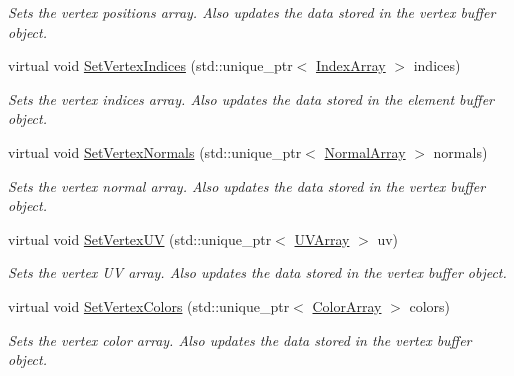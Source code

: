 \begin{DoxyCompactItemize}
\begin{DoxyCompactList}\small\item\em Sets the vertex positions array. Also updates the data stored in the vertex buffer object. \end{DoxyCompactList}\item 
virtual void \hyperlink{class_rendering_object_a61ea597df0c456834eac8eb4087fb573}{Set\+Vertex\+Indices} (std\+::unique\+\_\+ptr$<$ \hyperlink{class_rendering_object_a9931c88bca3384065c6691dfe1e60af1}{Index\+Array} $>$ indices)
\begin{DoxyCompactList}\small\item\em Sets the vertex indices array. Also updates the data stored in the element buffer object. \end{DoxyCompactList}\item 
virtual void \hyperlink{class_rendering_object_a4cd085aed01fbc5e4fae7076e00919d3}{Set\+Vertex\+Normals} (std\+::unique\+\_\+ptr$<$ \hyperlink{class_rendering_object_a327c4d892de8d6138fb59afa6d078257}{Normal\+Array} $>$ normals)
\begin{DoxyCompactList}\small\item\em Sets the vertex normal array. Also updates the data stored in the vertex buffer object. \end{DoxyCompactList}\item 
virtual void \hyperlink{class_rendering_object_a2a2b3c6ec2d13e8d3a4b6ac4c05ae11b}{Set\+Vertex\+U\+V} (std\+::unique\+\_\+ptr$<$ \hyperlink{class_rendering_object_a504ecd45ebe36dfa5b78c46d64d9904a}{U\+V\+Array} $>$ uv)
\begin{DoxyCompactList}\small\item\em Sets the vertex U\+V array. Also updates the data stored in the vertex buffer object. \end{DoxyCompactList}\item 
virtual void \hyperlink{class_rendering_object_aa1170c47ff02b2305a54c8aab3460201}{Set\+Vertex\+Colors} (std\+::unique\+\_\+ptr$<$ \hyperlink{class_rendering_object_a8a12e1f9be788d99af6c089e1c600022}{Color\+Array} $>$ colors)
\begin{DoxyCompactList}\small\item\em Sets the vertex color array. Also updates the data stored in the vertex buffer object. \end{DoxyCompactList}\end{DoxyCompactItemize}
